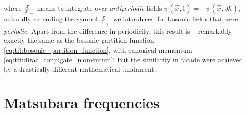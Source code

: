 where $\oint_-$ means to integrate over \emph{antiperiodic} fields $\psi(\vec{x}, 0) = -\psi(\vec{x}, \beta \hbar)$, naturally extending the symbol $\oint_+$ we introduced for bosonic fields that were \emph{periodic}.
Apart from the difference in periodicity, this result is -- remarkably -- exactly the same as the bosonic partition function \eqref{eq:tft:bosonic_partition_function}, with canonical momentum \eqref{eq:tft:dirac_conjugate_momentum}!
But the similarity in facade were achieved by a drastically different mathematical fundament.


\iffalse
The partition function is therefore
\begin{equation}
\begin{split}
	Z &= \int \dif \psi_0^\dagger \int \dif \psi_0 \, e^{-\psi_{n+1}^\dagger \psi_{n+1}} \braket{-\psi_0 | e^{-\beta(\hat{H} - \mu \hat{N})} | \psi_0} \\
	  &= \prod_n \int \dif \psi_n^\dagger \int \dif \psi_n \, e^{-\psi_{n+1}^\dagger \psi_{n+1}} \braket{\psi_{n+1} | e^{-(\hat{H} - \mu \hat{N}) \Delta \tau / \hbar} | \psi_n} \\
	  &= \prod_n \int \dif \psi_n^\dagger \int \dif \psi_n \, e^{-\psi_{n+1}^\dagger \psi_{n+1}} \braket{\psi_{n+1} | \psi_n} e^{-(H_n - \mu N) \Delta \tau / \hbar} \\
	  &= \prod_n \int \dif \psi_n^\dagger \int \dif \psi_n \, \exp \left\{ -\frac{\Delta t}{\hbar} \sum_n \int \dif^3 x \left( \psi^\dagger_{n+1} \frac{\psi_{n+1} - \psi_n}{\Delta t} + \ham - \mu \numdensity \right) \right\} \\
	  &= \oint_- \pathintdif \psi^\dagger \oint_- \pathintdif \psi \exp \left\{ \frac{1}{\hbar} \int_0^{\beta \hbar} \dif \tau \int \dif^3 x \left( -\psi^\dagger(\vec{x},\tau) \dot{\psi}(\vec{x},\tau) - \ham \left( \psi^\dagger(\vec{x},\tau), \psi(\vec{x},\tau) \right) + \mu \numdensity \right) \right\} \\
\end{split}
\end{equation}
\fi

\section{Matsubara frequencies}

